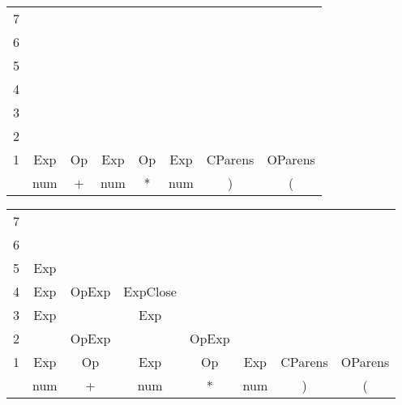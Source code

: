 \documentclass[fleqn]{article}
\begin{document}
\vspace{0.5in}




\begin{tabular}{r | c | c | c | c  | c | c | c|}
\cline{2-2}
7 &\\\cline{2-3}
6 && \\\cline{2-4}
5 && & \\\cline{2-5}
4 && & & \\\cline{2-6}
3 && & & & \\\cline{2-7}
2 & & & & & & \\\cline{2-8}
1 & Exp & Op & Exp & Op & Exp & CParens & OParens \\\cline{2-8}
& num & + & num & * & num & ) & ( \\\cline{2-8}
\cline {2-8}

\end{tabular}

\vspace{0.5in}

\begin{tabular}{r | c | c | c | c  | c | c | c|}
\cline{2-2}
7 &\\\cline{2-3}
6 && \\\cline{2-4}
5 & Exp & & \\\cline{2-5}
4 & Exp & OpExp & ExpClose & \\\cline{2-6}
3 & Exp & & Exp & & \\\cline{2-7}
2 & & OpExp & & OpExp & & \\\cline{2-8}
1 & Exp & Op & Exp & Op & Exp & CParens & OParens \\\cline{2-8}
& num & + & num & * & num & ) & ( \\\cline{2-8}
\cline {2-8}

\end{tabular}

\vspace{0.5in}
\end{document}

